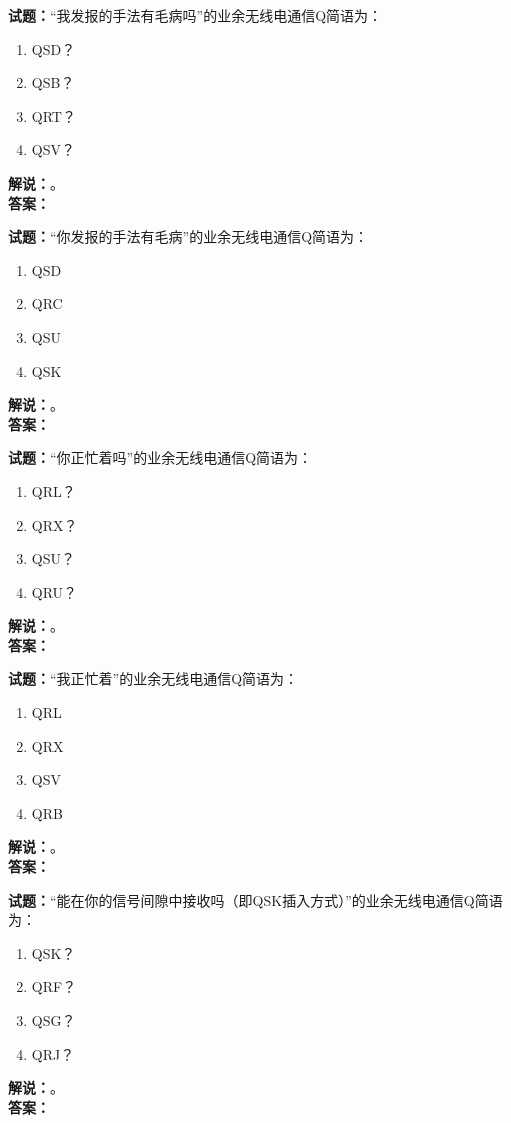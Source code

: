 \documentclass{ctexbook}
\begin{document}
\noindent\textbf{试题：}“我发报的手法有毛病吗”的业余无线电通信Q简语为：
\begin{enumerate}[leftmargin=3em]
\item QSD？
\item QSB？
\item QRT？
\item QSV？
\end{enumerate}
\noindent\textbf{解说：}\textbf{}。\\\noindent\textbf{答案：}

\bigskip




\noindent\textbf{试题：}“你发报的手法有毛病”的业余无线电通信Q简语为：
\begin{enumerate}[leftmargin=3em]
\item QSD
\item QRC
\item QSU
\item QSK
\end{enumerate}
\noindent\textbf{解说：}\textbf{}。\\\noindent\textbf{答案：}

\bigskip




\noindent\textbf{试题：}“你正忙着吗”的业余无线电通信Q简语为：
\begin{enumerate}[leftmargin=3em]
\item QRL？
\item QRX？
\item QSU？
\item QRU？
\end{enumerate}
\noindent\textbf{解说：}\textbf{}。\\\noindent\textbf{答案：}

\bigskip




\noindent\textbf{试题：}“我正忙着”的业余无线电通信Q简语为：
\begin{enumerate}[leftmargin=3em]
\item QRL
\item QRX
\item QSV
\item QRB
\end{enumerate}
\noindent\textbf{解说：}\textbf{}。\\\noindent\textbf{答案：}

\bigskip




\noindent\textbf{试题：}“能在你的信号间隙中接收吗（即QSK插入方式）”的业余无线电通信Q简语为：
\begin{enumerate}[leftmargin=3em]
\item QSK？
\item QRF？
\item QSG？
\item QRJ？
\end{enumerate}
\noindent\textbf{解说：}\textbf{}。\\\noindent\textbf{答案：}
\end{document}
